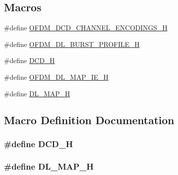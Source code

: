 \subsection*{Macros}
\begin{DoxyCompactItemize}
\item 
\#define \hyperlink{dl-mac-messages_8h_ad0c48399945fa37f414716ca3d271c9d}{O\+F\+D\+M\+\_\+\+D\+C\+D\+\_\+\+C\+H\+A\+N\+N\+E\+L\+\_\+\+E\+N\+C\+O\+D\+I\+N\+G\+S\+\_\+H}
\item 
\#define \hyperlink{dl-mac-messages_8h_a886b6146fb9c20b1b4365d80f8f56a0e}{O\+F\+D\+M\+\_\+\+D\+L\+\_\+\+B\+U\+R\+S\+T\+\_\+\+P\+R\+O\+F\+I\+L\+E\+\_\+H}
\item 
\#define \hyperlink{dl-mac-messages_8h_a281925b2f9dee3e27380981aa578f25a}{D\+C\+D\+\_\+H}
\item 
\#define \hyperlink{dl-mac-messages_8h_a776f8203f60226713f4b5336e29b575a}{O\+F\+D\+M\+\_\+\+D\+L\+\_\+\+M\+A\+P\+\_\+\+I\+E\+\_\+H}
\item 
\#define \hyperlink{dl-mac-messages_8h_a664929b21aa94e23c1dbed6019849285}{D\+L\+\_\+\+M\+A\+P\+\_\+H}
\end{DoxyCompactItemize}


\subsection{Macro Definition Documentation}
\subsubsection[{\texorpdfstring{D\+C\+D\+\_\+H}{DCD_H}}]{\setlength{\rightskip}{0pt plus 5cm}\#define D\+C\+D\+\_\+H}\hypertarget{dl-mac-messages_8h_a281925b2f9dee3e27380981aa578f25a}{}\label{dl-mac-messages_8h_a281925b2f9dee3e27380981aa578f25a}
\subsubsection[{\texorpdfstring{D\+L\+\_\+\+M\+A\+P\+\_\+H}{DL_MAP_H}}]{\setlength{\rightskip}{0pt plus 5cm}\#define D\+L\+\_\+\+M\+A\+P\+\_\+H}\hypertarget{dl-mac-messages_8h_a664929b21aa94e23c1dbed6019849285}{}\label{dl-mac-messages_8h_a664929b21aa94e23c1dbed6019849285}
